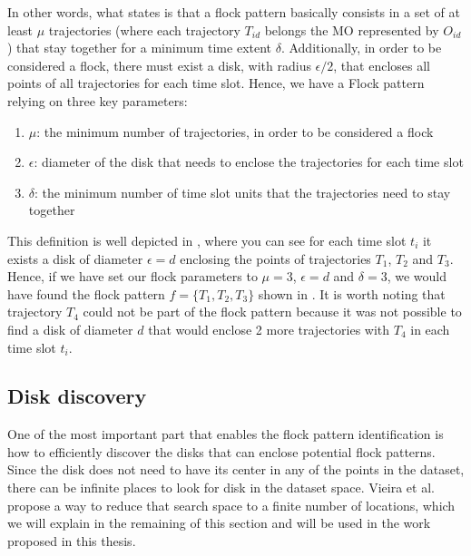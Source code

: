 In other words, what  states is that a flock pattern basically consists in a set of at least $\mu$
trajectories (where each trajectory $T_{id}$ belongs the MO represented by $O_{id}$) that stay together for a minimum
time extent $\delta$.  Additionally, in order to be considered a flock, there must exist a disk, with radius
$\epsilon/2$, that encloses all points of all trajectories for each time slot. Hence, we have a Flock pattern relying on
three key parameters:
\begin{enumerate}
    \item $\mu$: the minimum number of trajectories, in order to be considered a flock
    \item $\epsilon$: diameter of the disk that needs to enclose the trajectories for each time slot
    \item $\delta$: the minimum number of time slot units that the trajectories need to stay together
\end{enumerate}

This definition is well depicted in , where you can see for each time slot $t_i$ it exists a disk of
diameter $\epsilon = d$ enclosing the points of trajectories $T_1$, $T_2$ and $T_3$. Hence, if we have set our flock
parameters to $\mu = 3$, $\epsilon = d$ and $\delta = 3$, we would have found the flock pattern $f = \{T_1, T_2, T_3\}$
shown in . It is worth noting that trajectory $T_4$ could not be part of the flock pattern because it
was not possible to find a disk of diameter $d$ that would enclose 2 more trajectories with $T_4$ in each time slot
$t_i$.

\subsection{Disk discovery}
\label{subsec:disk_discovery}

One of the most important part that enables the flock pattern identification is how to efficiently discover the disks
that can enclose potential flock patterns. Since the disk does not need to have its center in any of the points in the
dataset, there can be infinite places to look for disk in the dataset space. Vieira et al. \citep{vieira} propose a way
to reduce that search space to a finite number of locations, which we will explain in the remaining of this section and
will be used in the work proposed in this thesis.

